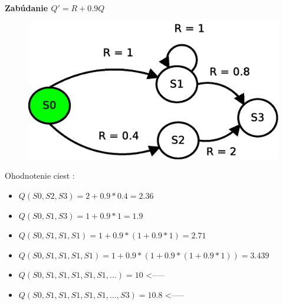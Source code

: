 \documentclass[xcolor=dvipsnames]{beamer}
\begin{document}
\begin{frame}{\bf Zabúdanie   $Q' = R + 0.9Q$}

  \begin{figure}[!htb]
  \centering
  \includegraphics[scale=.5]{../diagrams/rf_cycle_states.eps}
  \end{figure}

  Ohodnotenie ciest :
  \begin{itemize}
    \item $Q(S0, S2, S3) = 2 + 0.9*0.4 = 2.36$
    \item $Q(S0, S1, S3) = 1 + 0.9*1 = 1.9$
    \item $Q(S0, S1, S1, S1) = 1 + 0.9*(1 + 0.9*1) = 2.71 $
    \item $Q(S0, S1, S1, S1, S1) = 1 + 0.9*(1 + 0.9*(1 + 0.9*1)) = 3.439$
    \item $Q(S0, S1, S1, S1, S1, S1, ...) = 10$ <-----
    \item $Q(S0, S1, S1, S1, S1, S1, ..., S3) = 10.8$ <-----
  \end{itemize}

\end{frame}
\end{document}

